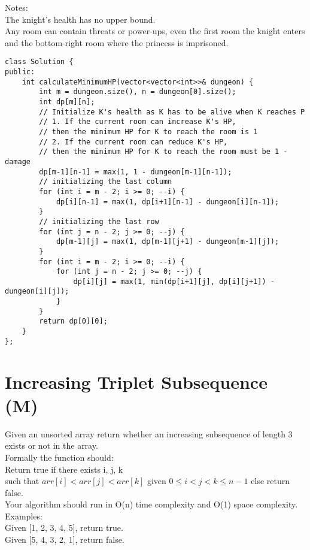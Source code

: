 Notes:\\
    The knight's health has no upper bound.\\
    Any room can contain threats or power-ups, even the first room the knight enters and the bottom-right room where the princess is imprisoned.\\

\begin{lstlisting}
class Solution {
public:
    int calculateMinimumHP(vector<vector<int>>& dungeon) {
        int m = dungeon.size(), n = dungeon[0].size();
        int dp[m][n];
        // Initialize K's health as K has to be alive when K reaches P
        // 1. If the current room can increase K's HP, 
        // then the minimum HP for K to reach the room is 1
        // 2. If the current room can reduce K's HP,
        // then the minimum HP for K to reach the room must be 1 - damage
        dp[m-1][n-1] = max(1, 1 - dungeon[m-1][n-1]);
        // initializing the last column
        for (int i = m - 2; i >= 0; --i) {
            dp[i][n-1] = max(1, dp[i+1][n-1] - dungeon[i][n-1]); 
        }
        // initializing the last row
        for (int j = n - 2; j >= 0; --j) {
            dp[m-1][j] = max(1, dp[m-1][j+1] - dungeon[m-1][j]); 
        }
        for (int i = m - 2; i >= 0; --i) {
            for (int j = n - 2; j >= 0; --j) {
                dp[i][j] = max(1, min(dp[i+1][j], dp[i][j+1]) - dungeon[i][j]);
            }
        }
        return dp[0][0];
    }
};
\end{lstlisting}


\section{Increasing Triplet Subsequence (M)}
Given an unsorted array return whether an increasing subsequence of length 3 exists or not in the array.\\

Formally the function should:\\
    Return true if there exists i, j, k\\
    such that $arr[i] < arr[j] < arr[k]$ given $0 \leq i < j < k \leq n-1$ else return false. \\

Your algorithm should run in O(n) time complexity and O(1) space complexity.\\

Examples:\\
Given [1, 2, 3, 4, 5],
return true.\\
Given [5, 4, 3, 2, 1],
return false. \\

